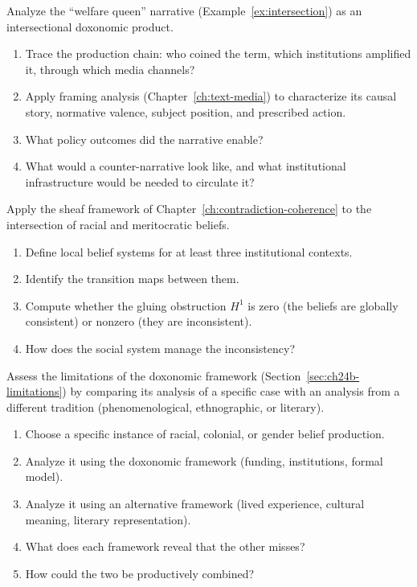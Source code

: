 \begin{exercise}
Analyze the ``welfare queen'' narrative (Example~\ref{ex:intersection}) as an intersectional doxonomic product.
\begin{enumerate}[nosep]
  \item Trace the production chain: who coined the term, which institutions amplified it, through which media channels?
  \item Apply framing analysis (Chapter~\ref{ch:text-media}) to characterize its causal story, normative valence, subject position, and prescribed action.
  \item What policy outcomes did the narrative enable?
  \item What would a counter-narrative look like, and what institutional infrastructure would be needed to circulate it?
\end{enumerate}
\end{exercise}

\begin{exercise}
Apply the sheaf framework of Chapter~\ref{ch:contradiction-coherence} to the intersection of racial and meritocratic beliefs.
\begin{enumerate}[nosep]
  \item Define local belief systems for at least three institutional contexts.
  \item Identify the transition maps between them.
  \item Compute whether the gluing obstruction $H^1$ is zero (the beliefs are globally consistent) or nonzero (they are inconsistent).
  \item How does the social system manage the inconsistency?
\end{enumerate}
\end{exercise}

\begin{exercise}
Assess the limitations of the doxonomic framework (Section~\ref{sec:ch24b-limitations}) by comparing its analysis of a specific case with an analysis from a different tradition (phenomenological, ethnographic, or literary).
\begin{enumerate}[nosep]
  \item Choose a specific instance of racial, colonial, or gender belief production.
  \item Analyze it using the doxonomic framework (funding, institutions, formal model).
  \item Analyze it using an alternative framework (lived experience, cultural meaning, literary representation).
  \item What does each framework reveal that the other misses?
  \item How could the two be productively combined?
\end{enumerate}
\end{exercise}
